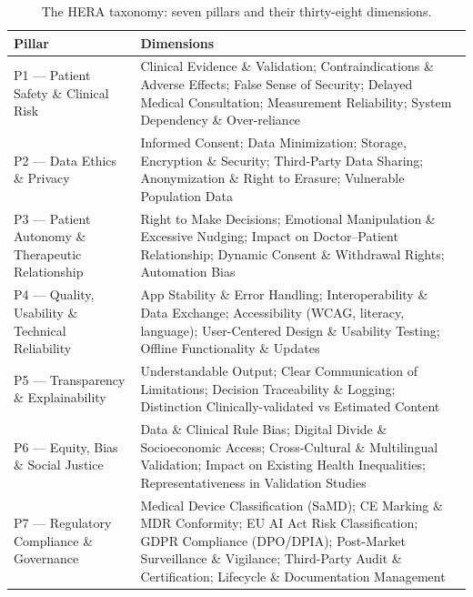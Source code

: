 \documentclass[11pt]{article}
\begin{document}
\begin{table}[t]
  \centering
  \footnotesize
  \setlength{\tabcolsep}{4pt}
  \begin{tabular}{|p{3.0cm}|p{12.3cm}|}
    \hline
    \textbf{Pillar} & \textbf{Dimensions} \\
    \hline
    P1 --- Patient Safety \& Clinical Risk &
    Clinical Evidence \& Validation; Contraindications \& Adverse Effects; False Sense of
    Security; Delayed Medical Consultation; Measurement Reliability; System Dependency \&
    Over-reliance \\
    \hline
    P2 --- Data Ethics \& Privacy &
    Informed Consent; Data Minimization; Storage, Encryption \& Security; Third-Party Data
    Sharing; Anonymization \& Right to Erasure; Vulnerable Population Data \\
    \hline
    P3 --- Patient Autonomy \& Therapeutic Relationship &
    Right to Make Decisions; Emotional Manipulation \& Excessive Nudging; Impact on
    Doctor--Patient Relationship; Dynamic Consent \& Withdrawal Rights; Automation Bias \\
    \hline
    P4 --- Quality, Usability \& Technical Reliability &
    App Stability \& Error Handling; Interoperability \& Data Exchange; Accessibility
    (WCAG, literacy, language); User-Centered Design \& Usability Testing; Offline
    Functionality \& Updates \\
    \hline
    P5 --- Transparency \& Explainability &
    Understandable Output; Clear Communication of Limitations; Decision Traceability \&
    Logging; Distinction Clinically-validated vs Estimated Content \\
    \hline
    P6 --- Equity, Bias \& Social Justice &
    Data \& Clinical Rule Bias; Digital Divide \& Socioeconomic Access; Cross-Cultural \&
    Multilingual Validation; Impact on Existing Health Inequalities; Representativeness in
    Validation Studies \\
    \hline
    P7 --- Regulatory Compliance \& Governance &
    Medical Device Classification (SaMD); CE Marking \& MDR Conformity; EU AI Act Risk
    Classification; GDPR Compliance (DPO/DPIA); Post-Market Surveillance \& Vigilance;
    Third-Party Audit \& Certification; Lifecycle \& Documentation Management \\
    \hline
  \end{tabular}
  \caption{The HERA taxonomy: seven pillars and their thirty-eight dimensions.}
  \label{tab:taxonomy}
\end{table}
\end{document}
